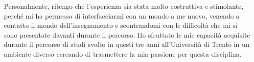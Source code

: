 Personalmente, ritengo che l'esperienza sia stata molto costruttiva e stimolante, perché mi ha permesso di interfacciarmi con un mondo a me nuovo, venendo a contatto il mondo dell'insegnamento e scontrandomi con le difficoltà che mi si sono presentate davanti durante il percorso. Ho sfruttato le mie capacità acquisite durante il percorso di studi svolto in questi tre anni all'Università di Trento in un ambiente diverso cercando di trasmettere la mia passione per questa disciplina.

